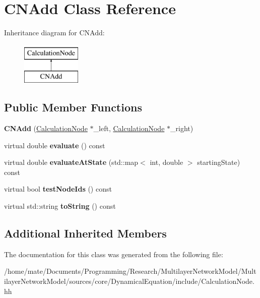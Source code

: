 \hypertarget{classCNAdd}{}\section{C\+N\+Add Class Reference}
\label{classCNAdd}
Inheritance diagram for C\+N\+Add\+:\begin{figure}[H]
\begin{center}
\leavevmode
\includegraphics[height=2.000000cm]{classCNAdd}
\end{center}
\end{figure}
\subsection*{Public Member Functions}
\begin{DoxyCompactItemize}
\item 
{\bfseries C\+N\+Add} (\hyperlink{classCalculationNode}{Calculation\+Node} $\ast$\+\_\+left, \hyperlink{classCalculationNode}{Calculation\+Node} $\ast$\+\_\+right)\hypertarget{classCNAdd_a7dab8d6be3e0fa6d804c3593cb1de715}{}\label{classCNAdd_a7dab8d6be3e0fa6d804c3593cb1de715}

\item 
virtual double {\bfseries evaluate} () const \hypertarget{classCNAdd_a5b558f1853ec5555c1ff3503f44b30e7}{}\label{classCNAdd_a5b558f1853ec5555c1ff3503f44b30e7}

\item 
virtual double {\bfseries evaluate\+At\+State} (std\+::map$<$ int, double $>$ starting\+State) const \hypertarget{classCNAdd_a8c4f9b20da9d50fcdd2ac1211da2eee6}{}\label{classCNAdd_a8c4f9b20da9d50fcdd2ac1211da2eee6}

\item 
virtual bool {\bfseries test\+Node\+Ids} () const \hypertarget{classCNAdd_a9ded4aa2b5379606d5d110b8cb05ee05}{}\label{classCNAdd_a9ded4aa2b5379606d5d110b8cb05ee05}

\item 
virtual std\+::string {\bfseries to\+String} () const \hypertarget{classCNAdd_a6a29c72a161475af0e05361e6cae49cc}{}\label{classCNAdd_a6a29c72a161475af0e05361e6cae49cc}

\end{DoxyCompactItemize}
\subsection*{Additional Inherited Members}


The documentation for this class was generated from the following file\+:\begin{DoxyCompactItemize}
\item 
/home/mate/\+Documents/\+Programming/\+Research/\+Multilayer\+Network\+Model/\+Multilayer\+Network\+Model/sources/core/\+Dynamical\+Equation/include/Calculation\+Node.\+hh\end{DoxyCompactItemize}
